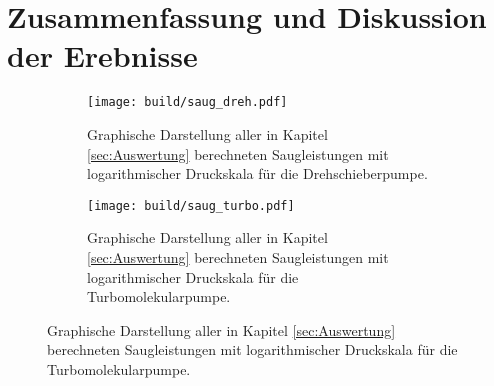 \section{Zusammenfassung und Diskussion der Erebnisse}
\label{sec:Diskussion}
\begin{figure}[ht]
    \begin{subfigure}{0.48\textwidth}
            \centering
            \texttt{[image: build/saug\_dreh.pdf]}
            \caption{Graphische Darstellung aller in Kapitel \ref{sec:Auswertung} berechneten Saugleistungen mit logarithmischer Druckskala für die Drehschieberpumpe.}
            \label{fig:saug_dreh}
    \end{subfigure}
    \hfill
    \begin{subfigure}{0.48\textwidth}
            \centering
            \texttt{[image: build/saug\_turbo.pdf]}
            \caption{Graphische Darstellung aller in Kapitel \ref{sec:Auswertung} berechneten Saugleistungen mit logarithmischer Druckskala für die Turbomolekularpumpe.}
            \label{fig:saug_turbo}
    \end{subfigure}
\end{figure}